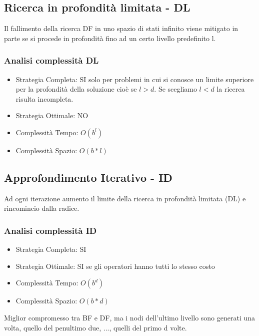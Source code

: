 \documentclass{article}
\begin{document}
\subsection{Ricerca in profondità limitata - DL}
Il fallimento della ricerca DF in uno spazio di stati infinito viene mitigato in parte se si procede in profondità fino ad un certo livello predefinito l.
\subsubsection{Analisi complessità DL}
\begin{itemize}
    \item Strategia Completa: SI solo per problemi in cui si conosce un limite superiore per la profondità della soluzione cioè se $l>d$. Se scegliamo $l < d$ la ricerca risulta incompleta.
    \item Strategia Ottimale: NO
    \item Complessità Tempo: $O(b^l)$
    \item Complessità Spazio: $O(b*l)$
\end{itemize}

\subsection{Approfondimento Iterativo - ID}
Ad ogni iterazione aumento il limite della ricerca in profondità limitata (DL) e rincomincio dalla radice.
\subsubsection{Analisi complessità ID}
\begin{itemize}
    \item Strategia Completa: SI
    \item Strategia Ottimale: SI se gli operatori hanno tutti lo stesso costo
    \item Complessità Tempo: $O(b^d)$
    \item Complessità Spazio: $O(b*d)$
\end{itemize}
Miglior compromesso tra BF e DF, ma i nodi dell'ultimo livello sono generati una volta, quello del penultimo due, ..., quelli del primo d volte.
\end{document}
